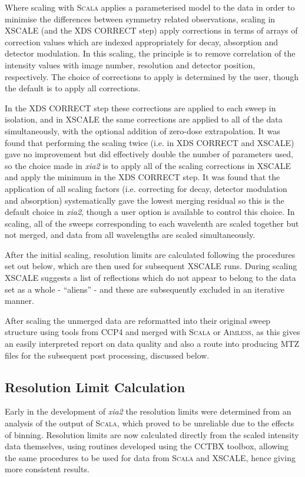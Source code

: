 \documentclass[preprint,pdf]{iucr}
\begin{document}
Where scaling with \textsc{Scala} applies a parameterised model to the data
in order to minimise the differences between symmetry related
observations, scaling in XSCALE (and the XDS CORRECT step) apply
corrections in terms of arrays of correction values which are indexed
appropriately for decay, absorption and detector modulation. In this
scaling, the principle is to remove correlation of the intensity values
with image number, resolution and detector position, 
respectively. The choice of corrections to apply
is determined by the user, though the default is to apply all corrections.

In the XDS CORRECT step these corrections are applied to each sweep in
isolation, and in XSCALE the same corrections are applied to all of the
data simultaneously, with the optional addition of zero-dose extrapolation. 
It was found that performing the scaling twice (i.e. in XDS CORRECT
and XSCALE)
gave no improvement but did effectively double the number of
parameters used, so the choice made in \emph{xia2} is to apply all of
the scaling corrections in XSCALE and apply the minimum in the XDS
CORRECT step. It was found that the application of all scaling factors
(i.e. correcting for decay, detector modulation and absorption)
systematically gave the lowest merging residual so this is the
default choice in \emph{xia2}, though a user option is available to
control this choice. In scaling, all of the sweeps corresponding to
each wavelenth are scaled together but not merged, and
data from all wavelengths are scaled simultaneously. 

After the initial scaling, resolution limits are calculated
following the procedures set out below, which are then used for subsequent
XSCALE runs. During scaling XSCALE suggests a
list of reflections which do not appear to belong to the data set as a
whole - ``aliens'' - and these are subsequently excluded in an iterative manner.

After scaling the unmerged data are reformatted into their original
sweep structure using tools from CCP4
and merged with \textsc{Scala} or \textsc{Aimless}, as this gives an
easily interpreted report on data quality and also a route into
producing MTZ files for the subsequent post processing, discussed below.

\subsection{Resolution Limit Calculation}

Early in the development of \emph{xia2} the resolution limits were
determined from an analysis of the output of \textsc{Scala}, which proved to be
unreliable due to the effects of binning. 
Resolution limits are now calculated directly from the
scaled intensity data themselves, using routines developed using
the CCTBX toolbox, allowing the same procedures to be used for data
from \textsc{Scala} and XSCALE, hence giving more consistent results.
\end{document}
